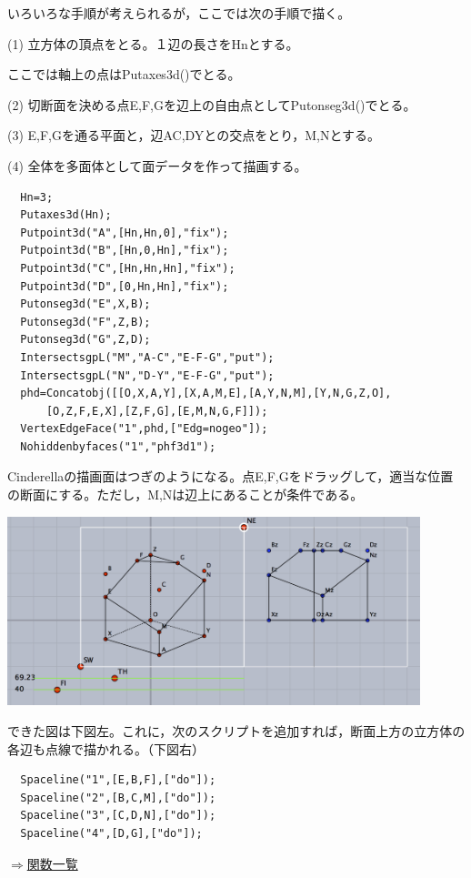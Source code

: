 \documentclass[papersize,a4paper,12pt,uplatex]{jsarticle}
\begin{document}
\begin{description}
   いろいろな手順が考えられるが，ここでは次の手順で描く。
   
 (1) 立方体の頂点をとる。１辺の長さをHnとする。
 
    ここでは軸上の点はPutaxes3d()でとる。
    
(2) 切断面を決める点E,F,Gを辺上の自由点としてPutonseg3d()でとる。

(3) E,F,Gを通る平面と，辺AC,DYとの交点をとり，M,Nとする。

(4) 全体を多面体として面データを作って描画する。
\begin{verbatim}
  Hn=3;
  Putaxes3d(Hn);
  Putpoint3d("A",[Hn,Hn,0],"fix");
  Putpoint3d("B",[Hn,0,Hn],"fix");
  Putpoint3d("C",[Hn,Hn,Hn],"fix");
  Putpoint3d("D",[0,Hn,Hn],"fix");
  Putonseg3d("E",X,B); 
  Putonseg3d("F",Z,B); 
  Putonseg3d("G",Z,D); 
  IntersectsgpL("M","A-C","E-F-G","put"); 
  IntersectsgpL("N","D-Y","E-F-G","put"); 
  phd=Concatobj([[O,X,A,Y],[X,A,M,E],[A,Y,N,M],[Y,N,G,Z,O],
      [O,Z,F,E,X],[Z,F,G],[E,M,N,G,F]]);
  VertexEdgeFace("1",phd,["Edg=nogeo"]);
  Nohiddenbyfaces("1","phf3d1"); 
\end{verbatim}
Cinderellaの描画面はつぎのようになる。点E,F,Gをドラッグして，適当な位置の断面にする。ただし，M,Nは辺上にあることが条件である。

\vspace{\baselineskip}
\includegraphics[bb=0 0 713.04 327.02 , width=12cm]{Fig/IntersectsgpL0.pdf}


できた図は下図左。これに，次のスクリプトを追加すれば，断面上方の立方体の各辺も点線で描かれる。（下図右）
\begin{verbatim}
  Spaceline("1",[E,B,F],["do"]);
  Spaceline("2",[B,C,M],["do"]);
  Spaceline("3",[C,D,N],["do"]);
  Spaceline("4",[D,G],["do"]);
\end{verbatim}
\begin{center}      \end{center}

\begin{flushright} \hyperlink{functionlist}{$\Rightarrow$関数一覧}\end{flushright}


\end{description}
\end{document}
